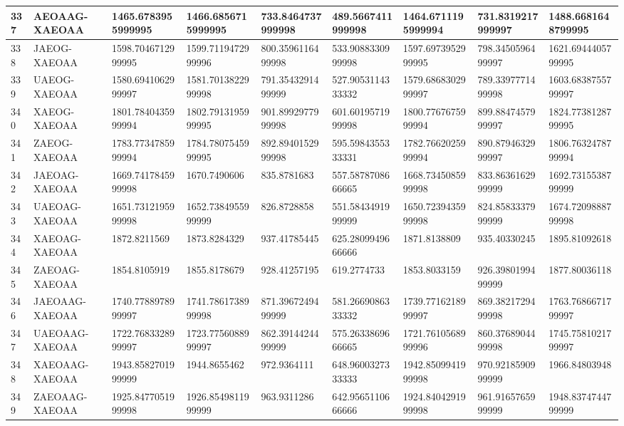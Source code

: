 {\begin{longtable}{|l|l|l|l|l|l|l|l|l|}
        337 & AEOAAG-XAEOAA & 1465.6783955999995 & 1466.6856715999995 & 733.8464737999998 & 489.5667411999998 & 1464.6711195999994 & 731.8319217999997 & 1488.6681648799995 \\ \hline
        338 & JAEOG-XAEOAA & 1598.7046712999995 & 1599.7119472999996 & 800.3596116499998 & 533.9088330999998 & 1597.6973952999995 & 798.3450596499997 & 1621.6944405799995 \\ \hline
        339 & UAEOG-XAEOAA & 1580.6941062999997 & 1581.7013822999998 & 791.3543291499999 & 527.9053114333332 & 1579.6868302999997 & 789.3397771499998 & 1603.6838755799997 \\ \hline
        340 & XAEOG-XAEOAA & 1801.7840435999994 & 1802.7913195999995 & 901.8992977999998 & 601.6019571999998 & 1800.7767675999994 & 899.8847457999997 & 1824.7738128799995 \\ \hline
        341 & ZAEOG-XAEOAA & 1783.7734785999994 & 1784.7807545999995 & 892.8940152999998 & 595.5984355333331 & 1782.7662025999994 & 890.8794632999997 & 1806.7632478799994 \\ \hline
        342 & JAEOAG-XAEOAA & 1669.7417845999998 & 1670.7490606 & 835.8781683 & 557.5878708666665 & 1668.7345085999998 & 833.8636162999999 & 1692.7315538799999 \\ \hline
        343 & UAEOAG-XAEOAA & 1651.7312195999998 & 1652.7384955999999 & 826.8728858 & 551.5843491999999 & 1650.7239435999998 & 824.8583337999999 & 1674.7209888799998 \\ \hline
        344 & XAEOAG-XAEOAA & 1872.8211569 & 1873.8284329 & 937.41785445 & 625.2809949666666 & 1871.8138809 & 935.40330245 & 1895.81092618 \\ \hline
        345 & ZAEOAG-XAEOAA & 1854.8105919 & 1855.8178679 & 928.41257195 & 619.2774733 & 1853.8033159 & 926.3980199499999 & 1877.80036118 \\ \hline
        346 & JAEOAAG-XAEOAA & 1740.7788978999997 & 1741.7861738999998 & 871.3967249499999 & 581.2669086333332 & 1739.7716218999997 & 869.3821729499998 & 1763.7686671799997 \\ \hline
        347 & UAEOAAG-XAEOAA & 1722.7683328999997 & 1723.7756088999997 & 862.3914424499999 & 575.2633869666665 & 1721.7610568999996 & 860.3768904499998 & 1745.7581021799997 \\ \hline
        348 & XAEOAAG-XAEOAA & 1943.8582701999999 & 1944.8655462 & 972.9364111 & 648.9600327333333 & 1942.8509941999998 & 970.9218590999999 & 1966.84803948 \\ \hline
        349 & ZAEOAAG-XAEOAA & 1925.8477051999998 & 1926.8549811999999 & 963.9311286 & 642.9565110666666 & 1924.8404291999998 & 961.9165765999999 & 1948.8374744799999 \\ \hline

\end{longtable}}
